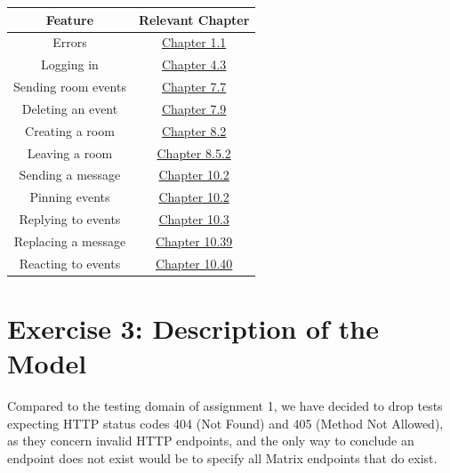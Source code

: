 \documentclass[a4paper]{article}
\begin{document}
\begin{table}[H]
\centering
\begin{tabular}{|c|c|}
	\hline
	Feature & Relevant Chapter \\
	\hline
	Errors & \href{https://spec.matrix.org/v1.19/client-server-api/\#standard-error-response}{Chapter 1.1} \\
	Logging in & \href{https://spec.matrix.org/v1.19/client-server-api/\#login}{Chapter 4.3} \\
	Sending room events & \href{https://spec.matrix.org/v1.19/client-server-api/\#sending-events-to-a-room}{Chapter 7.7} \\
	Deleting an event & \href{https://spec.matrix.org/v1.19/client-server-api/\#redactions}{Chapter 7.9} \\
	Creating a room & \href{https://spec.matrix.org/v1.19/client-server-api/\#creation}{Chapter 8.2} \\
	Leaving a room & \href{https://spec.matrix.org/v1.19/client-server-api/\#leaving-rooms}{Chapter 8.5.2} \\
	Sending a message & \href{https://spec.matrix.org/v1.19/client-server-api/\#instant-messaging}{Chapter 10.2} \\
	Pinning events & \href{https://spec.matrix.org/v1.19/client-server-api/\#events-2}{Chapter 10.2} \\
	Replying to events & \href{https://spec.matrix.org/v1.19/client-server-api/\#rich-replies}{Chapter 10.3} \\
	Replacing a message & \href{https://spec.matrix.org/v1.19/client-server-api/\#event-replacements}{Chapter 10.39} \\
	Reacting to events & \href{https://spec.matrix.org/v1.19/client-server-api/\#event-annotations-and-reactions}{Chapter 10.40} \\
	\hline
\end{tabular}
\end{table}
\section{Exercise 3: Description of the Model} \label{exercise-3-description-of-the-model}
Compared to the testing domain of assignment 1, we have decided to drop tests expecting HTTP status codes 404 (Not Found) and 405 (Method Not Allowed), as they concern invalid HTTP endpoints, and the only way to conclude an endpoint does not exist would be to specify all Matrix endpoints that do exist.
\end{document}
